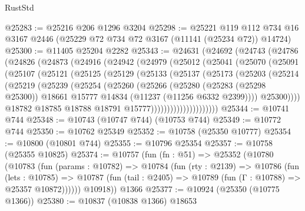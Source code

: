 \begin{lexlean}{RustStd}
\begin{coremodule}
@25283 := @25216 @206 @1296 @3204
@25298 := @25221
    @119
    @112
    @734
    @16
    @3167
    @2446
    (@25229 @72 @734 @72 @3167 (@11141 (@25234 @72)) @14724)
@25300 := @11405 @25204 @2282
@25343 := @24631
    (@24692
      (@24743
        (@24786
          (@24826
            (@24873
              (@24916
                (@24942
                  (@24979
                    (@25012
                      (@25041
                        (@25070
                          (@25091
                            (@25107
                              (@25121
                                (@25125
                                  (@25129
                                    (@25133
                                      (@25137
                                        (@25173
                                          (@25203
                                            (@25214
                                              (@25219
                                                (@25239
                                                  (@25254
                                                    (@25260
                                                      (@25266
                                                        (@25280
                                                          (@25283 (@25298 @25300))
                                                          @18661
                                                          @15777
                                                          @14834
                                                          (@11237 (@11256 @6332 @2399))))
                                                      @25300))))
                                              @18782
                                              @18785
                                              @18788
                                              @18791
                                              @15777)))))))))))))))))))))
@25344 := @10741 @744
@25348 := @10743 (@10747 @744) (@10753 @744)
@25349 := @10772 @744
@25350 := @10762 @25349
@25352 := @10758 (@25350 @10777)
@25354 := @10800 (@10801 @744)
@25355 := @10796 @25354
@25357 := @10758 (@25355 @10825)
@25374 := @10757
    (fun (fn : @51) =>
    @25352
      (@10780
        (@10783
          (fun (params : @10782) =>
          @10784
            (fun (rty : @2139) =>
            @10786
              (fun (lets : @10785) =>
              @10787 (fun (tail : @2405) => @10789 (fun (Γ : @10788) => @25357 @10872))))))
        @10918))
    @1366
@25377 := @10924 (@25350 (@10775 @1366))
@25380 := @10837 (@10838 @1366) @18653

\end{coremodule}
\end{lexlean}
